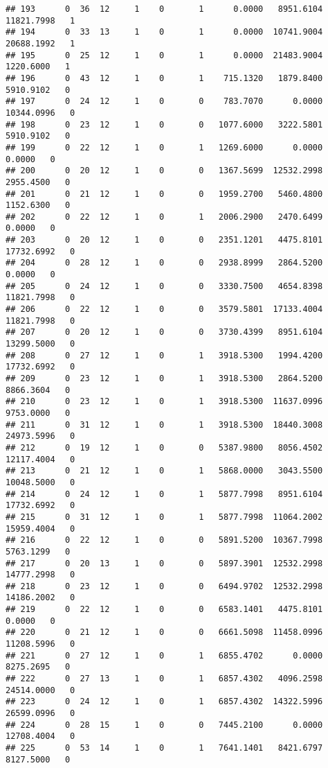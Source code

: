 \documentclass[
]{article}
\begin{document}
\begin{enumerate}
\begin{verbatim}
## 193      0  36  12     1    0       1      0.0000   8951.6104  11821.7998   1
## 194      0  33  13     1    0       1      0.0000  10741.9004  20688.1992   1
## 195      0  25  12     1    0       1      0.0000  21483.9004   1220.6000   1
## 196      0  43  12     1    0       1    715.1320   1879.8400   5910.9102   0
## 197      0  24  12     1    0       0    783.7070      0.0000  10344.0996   0
## 198      0  23  12     1    0       0   1077.6000   3222.5801   5910.9102   0
## 199      0  22  12     1    0       1   1269.6000      0.0000      0.0000   0
## 200      0  20  12     1    0       0   1367.5699  12532.2998   2955.4500   0
## 201      0  21  12     1    0       0   1959.2700   5460.4800   1152.6300   0
## 202      0  22  12     1    0       1   2006.2900   2470.6499      0.0000   0
## 203      0  20  12     1    0       0   2351.1201   4475.8101  17732.6992   0
## 204      0  28  12     1    0       0   2938.8999   2864.5200      0.0000   0
## 205      0  24  12     1    0       0   3330.7500   4654.8398  11821.7998   0
## 206      0  22  12     1    0       0   3579.5801  17133.4004  11821.7998   0
## 207      0  20  12     1    0       0   3730.4399   8951.6104  13299.5000   0
## 208      0  27  12     1    0       1   3918.5300   1994.4200  17732.6992   0
## 209      0  23  12     1    0       1   3918.5300   2864.5200   8866.3604   0
## 210      0  23  12     1    0       1   3918.5300  11637.0996   9753.0000   0
## 211      0  31  12     1    0       1   3918.5300  18440.3008  24973.5996   0
## 212      0  19  12     1    0       0   5387.9800   8056.4502  12117.4004   0
## 213      0  21  12     1    0       1   5868.0000   3043.5500  10048.5000   0
## 214      0  24  12     1    0       1   5877.7998   8951.6104  17732.6992   0
## 215      0  31  12     1    0       1   5877.7998  11064.2002  15959.4004   0
## 216      0  22  12     1    0       0   5891.5200  10367.7998   5763.1299   0
## 217      0  20  13     1    0       0   5897.3901  12532.2998  14777.2998   0
## 218      0  23  12     1    0       0   6494.9702  12532.2998  14186.2002   0
## 219      0  22  12     1    0       0   6583.1401   4475.8101      0.0000   0
## 220      0  21  12     1    0       0   6661.5098  11458.0996  11208.5996   0
## 221      0  27  12     1    0       1   6855.4702      0.0000   8275.2695   0
## 222      0  27  13     1    0       1   6857.4302   4096.2598  24514.0000   0
## 223      0  24  12     1    0       1   6857.4302  14322.5996  26599.0996   0
## 224      0  28  15     1    0       0   7445.2100      0.0000  12708.4004   0
## 225      0  53  14     1    0       1   7641.1401   8421.6797   8127.5000   0

\end{verbatim}
\end{enumerate}
\end{document}
